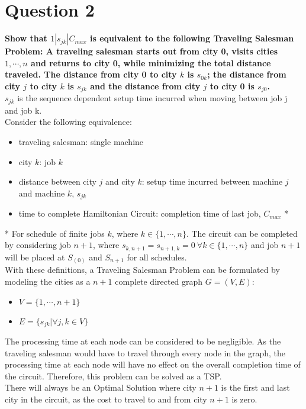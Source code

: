 \documentclass[a4paper, fleqn]{article}
\begin{document}
\section{Question 2}
\textbf{Show that $1|s_{jk}|C_{max}$ is equivalent to the following
Traveling Salesman Problem: A traveling salesman starts out
from city 0, visits cities $1,\cdots,n$ and returns to city 0, while minimizing the total distance traveled. The distance from city 0 to city $k$ is $s_{0k}$; the distance from city $j$ to city $k$ is $s_{jk}$ and the distance from city $j$ to city 0 is $s_{j0}$.}\\
$s_{jk}$ is the sequence dependent setup time incurred when moving between job j and job k.\\
Consider the following equivalence:\begin{itemize}
\item traveling salesman: single machine
\item city $k$: job $k$
\item distance between city $j$ and city $k$: setup time incurred between machine $j$ and machine $k$, $s_{jk}$
\item time to complete Hamiltonian Circuit: completion time of last job, $C_{max}$ *
\end{itemize}
*    For schedule of finite jobs $k$, where $k\in\{1,\cdots,n\}$. The circuit can be completed by considering job $n+1$, where $s_{k,n+1}=s_{n+1,k}=0\ \forall k\in\{1,\cdots,n\}$ and job $n+1$ will be placed at $S_{(0)}$ and $S_{n+1}$ for all schedules.\\
With these definitions, a Traveling Salesman Problem can be formulated by modeling the cities as a $n+1$ complete directed graph $G=(V,E)$: \begin{itemize}
\item $V=\{1,\cdots,n+1\}$
\item $E=\{s_{jk}|\forall j,k\in V\}$
\end{itemize}
The processing time at each node can be considered to be negligible. As the traveling salesman would have to travel through every node in the graph, the processing time at each node will have no effect on the overall completion time of the circuit. Therefore, this problem can be solved as a TSP.\\
There will always be an Optimal Solution where city $n+1$ is the first and last city in the circuit, as the cost to travel to and from city $n+1$ is zero.
\end{document}
